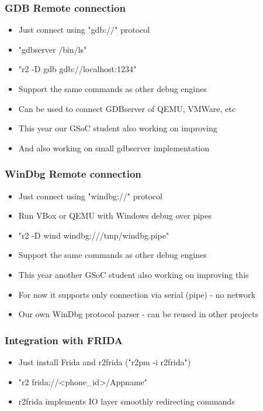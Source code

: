 \documentclass[10pt,pdf,utf8,english,compress,hyperref={unicode}]{beamer}
\begin{document}

\begin{frame}[fragile]
\frametitle{GDB Remote connection}
\begin{itemize}
	\item Just connect using "gdb://" protocol
	\item "gdbserver /bin/ls"
	\item "r2 -D gdb gdb://localhost:1234"
	\item Support the same commands as other debug engines
	\item Can be used to connect GDBserver of QEMU, VMWare, etc
	\item This year our GSoC student also working on improving
	\item And also working on small gdbserver implementation
\end{itemize}
\end{frame}

\begin{frame}[fragile]
\frametitle{WinDbg Remote connection}
\begin{itemize}
	\item Just connect using "windbg://" protocol
	\item Run VBox or QEMU with Windows debug over pipes
	\item "r2 -D wind windbg:///tmp/windbg.pipe"
	\item Support the same commands as other debug engines
	\item This year another GSoC student also working on improving this
	\item For now it supports only connection via serial (pipe) - no network
	\item Our own WinDbg protocol parser - can be reused in other projects
\end{itemize}
\end{frame}

\begin{frame}[fragile]
\frametitle{Integration with FRIDA}
\begin{itemize}
	\item Just install Frida and r2frida ("r2pm -i r2frida")
	\item "r2 frida://<phone\_id>/Appname"
	\item r2frida implements IO layer smoothly redirecting commands
\end{itemize}
\end{frame}
\end{document}
